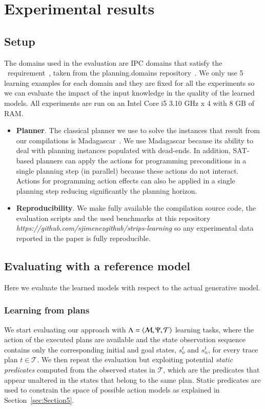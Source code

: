 
\section{Experimental results}
\label{experiments}


\subsection{Setup}
The domains used in the evaluation are IPC domains that satisfy the \strips\ requirement~\cite{fox2003pddl2}, taken from the {\sc planning.domains} repository~\cite{muise2016planning}. We only use 5 learning examples for each domain and they are fixed for all the experiments so we can evaluate the impact of the input knowledge in the quality of the learned models. All experiments are run on an Intel Core i5 3.10 GHz x 4 with 8 GB of RAM.
\begin{itemize}
\item {\bf Planner}. The classical planner we use to solve the instances that result from our compilations is {\sc Madagascar}~\cite{rintanen2014madagascar}. We use {\sc Madagascar} because its ability to deal with planning instances populated with dead-ends. In addition, SAT-based planners can apply the actions for programming preconditions in a single planning step (in parallel) because these actions do not interact. Actions for programming action effects can also be applied in a single planning step reducing significantly the planning horizon.
\item {\bf Reproducibility}. We make fully available the compilation source code, the evaluation scripts and the used benchmarks at this repository {\em https://github.com/sjimenezgithub/strips-learning} so any experimental data reported in the paper is fully reproducible.
\end{itemize}

\subsection{Evaluating with a reference model}
Here we evaluate the learned models with respect to the actual generative model. 

\subsubsection{Learning from plans}
We start evaluating our approach with $\Lambda={\langle \mathcal{M},\Psi,\mathcal{T} \rangle}$ learning tasks, where the action of the executed plans are available and the state observation sequence contains only the corresponding initial and goal states, $s_o^t$ and $s_n^t$, for every trace plan $t\in\mathcal{T}$. We then repeat the evaluation but exploiting potential \emph{static predicates} computed from the observed states in $\mathcal{T}$, which are the predicates that appear unaltered in the states that belong to the same plan. Static predicates are used to constrain the space of possible action models as explained in Section~\ref{sec:Section5}.

